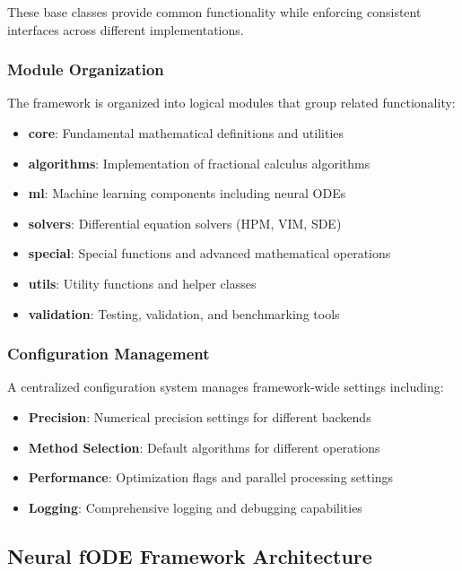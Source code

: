 These base classes provide common functionality while enforcing consistent interfaces across different implementations.

\subsubsection{Module Organization}

The framework is organized into logical modules that group related functionality:

\begin{itemize}
    \item \textbf{core}: Fundamental mathematical definitions and utilities
    \item \textbf{algorithms}: Implementation of fractional calculus algorithms
    \item \textbf{ml}: Machine learning components including neural ODEs
    \item \textbf{solvers}: Differential equation solvers (HPM, VIM, SDE)
    \item \textbf{special}: Special functions and advanced mathematical operations
    \item \textbf{utils}: Utility functions and helper classes
    \item \textbf{validation}: Testing, validation, and benchmarking tools
\end{itemize}

\subsubsection{Configuration Management}

A centralized configuration system manages framework-wide settings including:

\begin{itemize}
    \item \textbf{Precision}: Numerical precision settings for different backends
    \item \textbf{Method Selection}: Default algorithms for different operations
    \item \textbf{Performance}: Optimization flags and parallel processing settings
    \item \textbf{Logging}: Comprehensive logging and debugging capabilities
\end{itemize}

\subsection{Neural fODE Framework Architecture}

